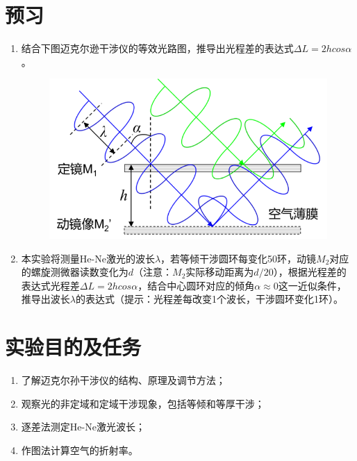 \documentclass[signature=data]{physicsreport}
\begin{document}
\maketitle

\section{预习}
\begin{enumerate}
    \item 结合下图迈克尔逊干涉仪的等效光路图，推导出光程差的表达式$\Delta L = 2hcos\alpha$。
    \begin{figure}[htbp]
    \flushright
    \includegraphics{images/lab1/figure1.png}
    \end{figure} 
    \vspace{3cm}
    \item 本实验将测量He-Ne激光的波长$\lambda$，若等倾干涉圆环每变化50环，动镜$M_2$对应的螺旋测微器读数变化为$d$（注意：$M_2$实际移动距离为$d/20$），根据光程差的表达式光程差$\Delta L = 2hcos\alpha$，结合中心圆环对应的倾角$\alpha \approx 0$这一近似条件，推导出波长$\lambda$的表达式（提示：光程差每改变1个波长，干涉圆环变化1环）。
    \vspace{5cm}
\end{enumerate}

\makeatletter
{}
\makeatother

\section{实验目的及任务}
\begin{enumerate}
    \item 了解迈克尔孙干涉仪的结构、原理及调节方法；
    \item 观察光的非定域和定域干涉现象，包括等倾和等厚干涉；
    \item 逐差法测定He-Ne激光波长；
    \item 作图法计算空气的折射率。
\end{enumerate}
\vspace{0.7cm}
\end{document}
